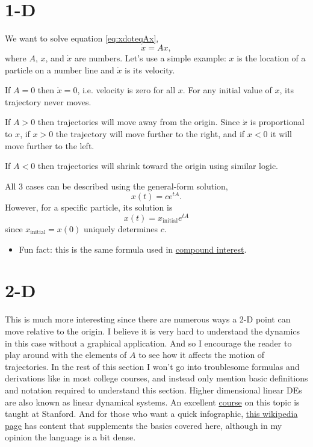 \documentclass[11pt, oneside]{article}   	%
\begin{document}
\section{1-D}

We want to solve equation \ref*{eq:xdoteqAx},
$$\dot{x} = Ax,$$
where $A$, $x$, and $\dot{x}$ are numbers.
Let's use a simple example: $x$ is the location of a particle on a number line and $\dot{x}$ is its velocity.

If $A = 0$ then $\dot{x} = 0$, i.e. velocity is zero for all $x$.
For any initial value of $x$, its trajectory never moves.

If $A > 0$ then trajectories will move away from the origin.
Since $\dot{x}$ is proportional to $x$,
if $x > 0$ the trajectory will move further to the right, and if $x < 0$ it will move further to the left.

If $A < 0$ then trajectories will shrink toward the origin using similar logic.

All 3 cases can be described using the general-form solution,
\begin{equation}
x(t) = ce^{tA} .
\end{equation}
However, for a specific particle, its solution is
\begin{equation} \label{eq:1Dsol}
x(t) = x_\mathrm{initial} e^{tA}
\end{equation}
since $x_\mathrm{initial} = x(0)$ uniquely determines $c$.
\begin{itemize}
  \item Fun fact: this is the same formula used in
  \href{https://en.wikipedia.org/wiki/Compound_interest#Continuous_compounding}{compound interest}.
\end{itemize}

\section{2-D}

This is much more interesting since there are numerous ways a 2-D point can move relative to the origin.
I believe it is very hard to understand the dynamics in this case without a graphical application.
And so I encourage the reader to play around with the elements of $A$ to see how it affects the motion of trajectories.
In the rest of this section I won't go into troublesome formulas and derivations like in most college courses,
and instead only mention basic definitions and notation required to understand this section.
Higher dimensional linear DEs are also known as linear dynamical systems.
An excellent \href{https://see.stanford.edu/Course/EE263}{course} on this topic is taught at Stanford.
And for those who want a quick infographic,
\href{https://en.wikipedia.org/wiki/Stability_theory}{this wikipedia page} has content that supplements the basics covered here,
although in my opinion the language is a bit dense.
\end{document}

